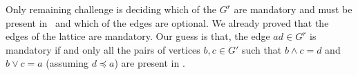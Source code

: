 Only remaining challenge is deciding which of the \(G^r\) are mandatory 
and must be present in \mG\ and which of the edges are optional.
We already proved that the edges of the lattice are mandatory.
Our guess is that, the edge \(ad \in G^r\) is mandatory if and only
all the pairs of vertices \(b,c \in G'\) such that \(b\wedge c = d\)
and \(b \vee c = a\) (assuming \(d \preceq a\)) are present in \mG\@.
